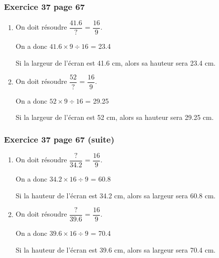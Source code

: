 \documentclass[xcolor={dvipsnames}]{beamer}
\begin{document}
\begin{frame}
	\frametitle{Exercice 37 page 67}
	
	\begin{Large}
		\begin{enumerate}
			
			\item On doit résoudre $\dfrac{\num{41.6}}{?} $ = $\dfrac{16}{9}$. \pause %
			
			On a donc $\num{41.6} \times 9 \div 16 $ \pause = \num{23.4} %
			
			Si la largeur de l'écran est \num{41.6} cm, alors sa hauteur sera \num{23.4} cm.
			
			\vspace*{1cm}
			
			\item On doit résoudre $\dfrac{\num{52}}{?} $ = $\dfrac{16}{9}$. %
			
			On a donc $\num{52} \times 9 \div 16 $  = \num{29.25} %
			
			Si la largeur de l'écran est \num{52} cm, alors sa hauteur sera \num{29.25} cm.
			
			
		\end{enumerate}
	\end{Large}
	
\end{frame}


\begin{frame}
	\frametitle{Exercice 37 page 67 (suite)}
	
	\begin{Large}
		\begin{enumerate}
			

			
			\item On doit résoudre $\dfrac{?}{\num{34.2}} $ = $\dfrac{16}{9}$. \pause %
			
			On a donc $\num{34.2} \times 16 \div 9 $ \pause = \num{60.8} %
			
			Si la hauteur de l'écran est \num{34.2} cm, alors sa largeur sera \num{60.8} cm.
			
			\vspace*{1cm}
			
			\item On doit résoudre $\dfrac{?}{\num{39.6}} $ = $\dfrac{16}{9}$. %
			
			On a donc $\num{39.6} \times 16 \div 9 $ = \num{70.4} %
			
			Si la hauteur de l'écran est \num{39.6} cm, alors sa largeur sera \num{70.4} cm.
		\end{enumerate}
	\end{Large}
	
\end{frame}
\end{document}
